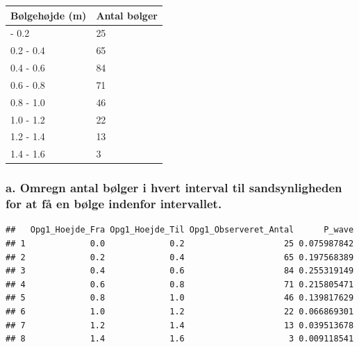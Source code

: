 \documentclass[
]{article}
\newenvironment{Shaded}{\begin{snugshade}}{\end{snugshade}}
\newcommand{\AttributeTok}[1]{\textcolor[rgb]{0.13,0.29,0.53}{#1}}
\newcommand{\ConstantTok}[1]{\textcolor[rgb]{0.56,0.35,0.01}{#1}}
\newcommand{\FunctionTok}[1]{\textcolor[rgb]{0.13,0.29,0.53}{\textbf{#1}}}
\newcommand{\NormalTok}[1]{#1}
\newcommand{\OtherTok}[1]{\textcolor[rgb]{0.56,0.35,0.01}{#1}}
\newcommand{\SpecialCharTok}[1]{\textcolor[rgb]{0.81,0.36,0.00}{\textbf{#1}}}
\newcommand{\StringTok}[1]{\textcolor[rgb]{0.31,0.60,0.02}{#1}}
\begin{document}
\begin{longtable}[]{@{}ll@{}}
\toprule\noalign{}
Bølgehøjde (m) & Antal bølger \\
\midrule\noalign{}
\endhead
\bottomrule\noalign{}
\endlastfoot
0.0 - 0.2 & 25 \\
0.2 - 0.4 & 65 \\
0.4 - 0.6 & 84 \\
0.6 - 0.8 & 71 \\
0.8 - 1.0 & 46 \\
1.0 - 1.2 & 22 \\
1.2 - 1.4 & 13 \\
1.4 - 1.6 & 3 \\
\end{longtable}

\subsubsection{a. Omregn antal bølger i hvert interval til
sandsynligheden for at få en bølge indenfor
intervallet.}\label{a.-omregn-antal-buxf8lger-i-hvert-interval-til-sandsynligheden-for-at-fuxe5-en-buxf8lge-indenfor-intervallet.}

\begin{Shaded}
\end{Shaded}

\begin{verbatim}
##   Opg1_Hoejde_Fra Opg1_Hoejde_Til Opg1_Observeret_Antal      P_wave
## 1             0.0             0.2                    25 0.075987842
## 2             0.2             0.4                    65 0.197568389
## 3             0.4             0.6                    84 0.255319149
## 4             0.6             0.8                    71 0.215805471
## 5             0.8             1.0                    46 0.139817629
## 6             1.0             1.2                    22 0.066869301
## 7             1.2             1.4                    13 0.039513678
## 8             1.4             1.6                     3 0.009118541
\end{verbatim}
\end{document}
